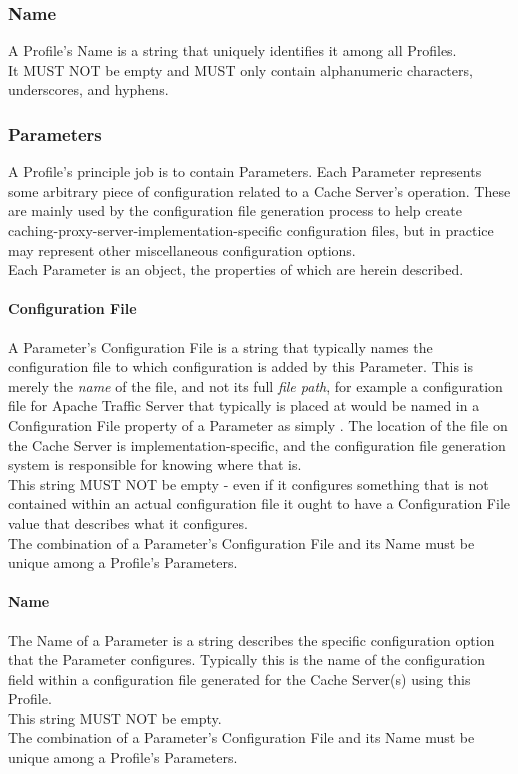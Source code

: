 \subsubsection{Name}
A Profile's Name is a string that uniquely identifies it among all Profiles.\\
It MUST NOT be empty and MUST only contain alphanumeric characters,
underscores, and hyphens.

\subsubsection{Parameters}
A Profile's principle job is to contain Parameters. Each Parameter represents
some arbitrary piece of configuration related to a Cache Server's operation.
These are mainly used by the configuration file generation process to help
create caching-proxy-server-implementation-specific configuration files, but in
practice may represent other miscellaneous configuration options.\\
Each Parameter is an object, the properties of which are herein described.

\paragraph{Configuration File}
A Parameter's Configuration File is a string that typically names the
configuration file to which configuration is added by this Parameter. This
is merely the \emph{name} of the file, and not its full \emph{file path}, for
example a configuration file for Apache Traffic Server that typically is placed
at  would be named in a Configuration
File property of a Parameter as simply . The location of
the file on the Cache Server is implementation-specific, and the configuration
file generation system is responsible for knowing where that is.\\
This string MUST NOT be empty - even if it configures something that is not
contained within an actual configuration file it ought to have a Configuration
File value that describes what it configures.\\
The combination of a Parameter's Configuration File and its Name must be unique
among a Profile's Parameters.

\paragraph{Name}
The Name of a Parameter is a string describes the specific configuration option
that the Parameter configures. Typically this is the name of the configuration
field within a configuration file generated for the Cache Server(s) using this
Profile.\\
This string MUST NOT be empty.\\
The combination of a Parameter's Configuration File and its Name must be unique
among a Profile's Parameters.

